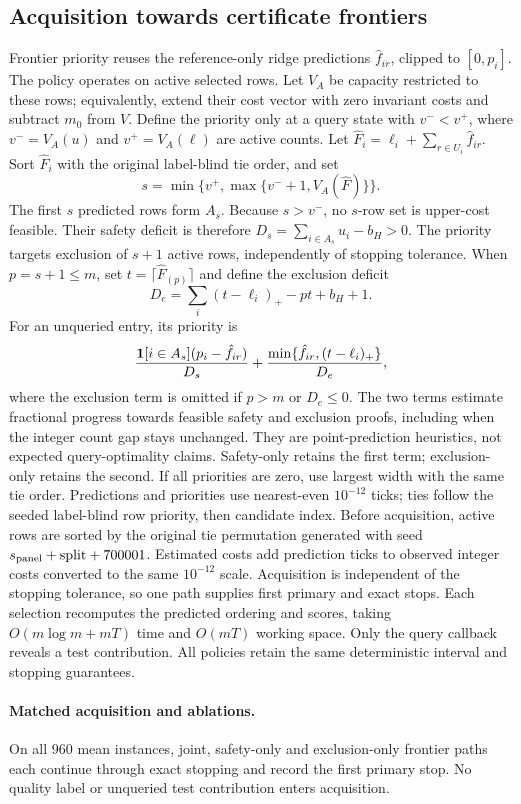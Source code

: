 \subsection{Acquisition towards certificate frontiers}
\label{app:frontier}
Frontier priority reuses the reference-only ridge predictions $\hat f_{ir}$, clipped to $[0,p_i]$. The policy operates on active selected rows. Let $V_A$ be capacity restricted to these rows; equivalently, extend their cost vector with zero invariant costs and subtract $m_0$ from $V$. Define the priority only at a query state with $v^-<v^+$, where $v^-=V_A(u)$ and $v^+=V_A(\ell)$ are active counts. Let $\hat F_i=\ell_i+\sum_{r\in U_i}\hat f_{ir}$. Sort $\hat F_i$ with the original label-blind tie order, and set
\[
 s=\min\{v^+,\max\{v^-+1,V_A(\hat F)\}\}.
\]
The first $s$ predicted rows form $A_s$. Because $s>v^-$, no $s$-row set is upper-cost feasible. Their safety deficit is therefore $D_s=\sum_{i\in A_s}u_i-b_H>0$. The priority targets exclusion of $s+1$ active rows, independently of stopping tolerance. When $p=s+1\le m$, set $t=\lceil\hat F_{(p)}\rceil$ and define the exclusion deficit
\[
 D_e=\sum_i(t-\ell_i)_+-pt+b_H+1.
\]
For an unqueried entry, its priority is
\[
 \frac{\mathbf{1}[i\in A_s](p_i-\hat f_{ir})}{D_s}
 +\frac{\min\{\hat f_{ir},(t-\ell_i)_+\}}{D_e},
\]
where the exclusion term is omitted if $p>m$ or $D_e\le0$. The two terms estimate fractional progress towards feasible safety and exclusion proofs, including when the integer count gap stays unchanged. They are point-prediction heuristics, not expected query-optimality claims. Safety-only retains the first term; exclusion-only retains the second. If all priorities are zero, use largest width with the same tie order. Predictions and priorities use nearest-even $10^{-12}$ ticks; ties follow the seeded label-blind row priority, then candidate index. Before acquisition, active rows are sorted by the original tie permutation generated with seed $s_{\rm panel}+\mathrm{split}+700001$. Estimated costs add prediction ticks to observed integer costs converted to the same $10^{-12}$ scale. Acquisition is independent of the stopping tolerance, so one path supplies first primary and exact stops. Each selection recomputes the predicted ordering and scores, taking $O(m\log m+mT)$ time and $O(mT)$ working space. Only the query callback reveals a test contribution. All policies retain the same deterministic interval and stopping guarantees.

\paragraph{Matched acquisition and ablations.}
On all 960 mean instances, joint, safety-only and exclusion-only frontier paths each continue through exact stopping and record the first primary stop. No quality label or unqueried test contribution enters acquisition.

